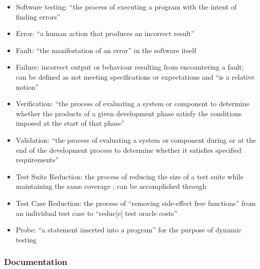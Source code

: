 \begin{itemize}
      \item Software testing: ``the process of executing a program with the
            intent of finding errors'' \citep[p.~438]{PetersAndPedrycz2000}
      \item Error: ``a human action that produces an incorrect result''
            \citep[p.~399]{vanVliet2000}
      \item Fault: ``the manifestation of an error'' in the software itself
            \citep[p.~400]{vanVliet2000}
      \item Failure: incorrect output or behaviour resulting from encountering
            a fault; can be defined as not meeting specifications or
            expectations and ``is a relative notion''
            \citep[p.~400]{vanVliet2000}
      \item Verification: ``the process of evaluating a system or component
            to determine whether the products of a given development phase
            satisfy the conditions imposed at the start of that phase''
            \citep[p.~400]{vanVliet2000}
      \item Validation: ``the process of evaluating a system or component
            during or at the end of the development process to determine
            whether it satisfies specified requirements''
            \citep[p.~400]{vanVliet2000}
      \item Test Suite Reduction: the process of reducing the size of a test
            suite while maintaining the same coverage
            \citep[p.~519]{BarrEtAl2015}; can be accomplished through
      \item Test Case Reduction: the process of ``removing side-effect free
            functions'' from an individual test case to ``reduc[e] test oracle
            costs'' \citep[p.~519]{BarrEtAl2015}
      \item Probe: ``a statement inserted into a program'' for the purpose of
            dynamic testing \citep[p.~438]{PetersAndPedrycz2000}
\end{itemize}

\subsubsection{Documentation}

